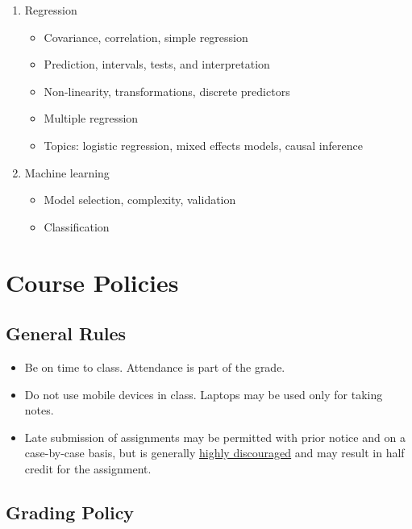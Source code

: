 \documentclass[11pt]{article}
\begin{document}
\begin{enumerate}
\item Regression

  \begin{itemize}
  \item Covariance, correlation, simple regression
  \item Prediction, intervals, tests, and interpretation
  \item Non-linearity, transformations, discrete predictors
  \item Multiple regression
  \item Topics: logistic regression, mixed effects models, causal inference
  \end{itemize}

\item Machine learning

  \begin{itemize}
  \item Model selection, complexity, validation
  \item Classification
  \end{itemize}
  
\end{enumerate}


\section*{Course Policies}

\subsection*{General Rules}

\begin{itemize}
\item Be on time to class. Attendance is part of the grade.
\item Do not use mobile devices in class. Laptops may be used only for taking notes.
\item Late submission of assignments may be permitted with prior notice and on a case-by-case basis, but is generally \underline{highly discouraged} and may result in half credit for the assignment.
\end{itemize}

\subsection*{Grading Policy}
\end{document}
